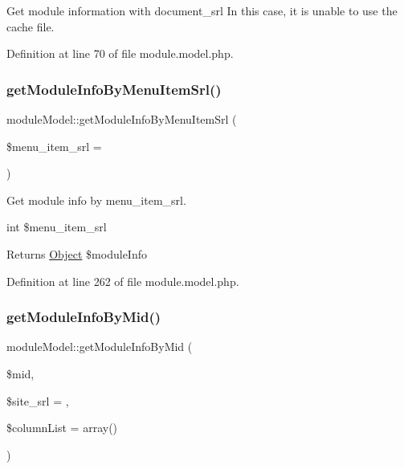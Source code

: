 Get module information with document\+\_\+srl In this case, it is unable to use the cache file. 



Definition at line 70 of file module.\+model.\+php.

\mbox{\label{classmoduleModel_a48fc8aa25e189a13e7416d4c92e3aa04}} 
\subsubsection{\texorpdfstring{get\+Module\+Info\+By\+Menu\+Item\+Srl()}{getModuleInfoByMenuItemSrl()}}
{\footnotesize\ttfamily module\+Model\+::get\+Module\+Info\+By\+Menu\+Item\+Srl (\begin{DoxyParamCaption}\item[{}]{\$menu\+\_\+item\+\_\+srl = {} }\end{DoxyParamCaption})}

Get module info by menu\+\_\+item\+\_\+srl.

int \$menu\+\_\+item\+\_\+srl

\begin{DoxyReturn}{Returns}
\hyperlink{classObject}{Object} \$module\+Info 
\end{DoxyReturn}


Definition at line 262 of file module.\+model.\+php.

\mbox{\label{classmoduleModel_a543ca661568188ef493ff138246de29c}} 
\subsubsection{\texorpdfstring{get\+Module\+Info\+By\+Mid()}{getModuleInfoByMid()}}
{\footnotesize\ttfamily module\+Model\+::get\+Module\+Info\+By\+Mid (\begin{DoxyParamCaption}\item[{}]{\$mid,  }\item[{}]{\$site\+\_\+srl = {},  }\item[{}]{\$column\+List = {\ttfamily array()} }\end{DoxyParamCaption})}



